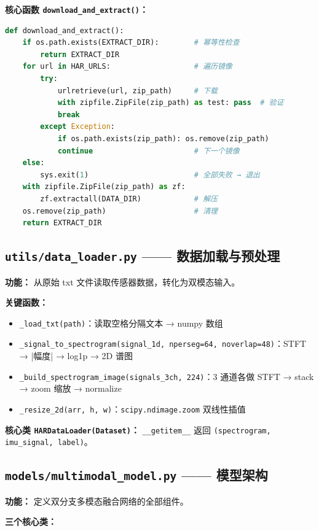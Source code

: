 \documentclass[12pt,a4paper]{ctexart}
\newcommand{\file}[1]{\texttt{#1}}
\newcommand{\code}[1]{\texttt{#1}}
\begin{document}
\textbf{核心函数 \code{download\_and\_extract()}：}

\begin{lstlisting}[language=Python]
def download_and_extract():
    if os.path.exists(EXTRACT_DIR):        # 幂等性检查
        return EXTRACT_DIR
    for url in HAR_URLS:                   # 遍历镜像
        try:
            urlretrieve(url, zip_path)     # 下载
            with zipfile.ZipFile(zip_path) as test: pass  # 验证
            break
        except Exception:
            if os.path.exists(zip_path): os.remove(zip_path)
            continue                       # 下一个镜像
    else:
        sys.exit(1)                        # 全部失败 → 退出
    with zipfile.ZipFile(zip_path) as zf:
        zf.extractall(DATA_DIR)            # 解压
    os.remove(zip_path)                    # 清理
    return EXTRACT_DIR
\end{lstlisting}

\subsection{\file{utils/data\_loader.py} —— 数据加载与预处理}

\textbf{功能：} 从原始 txt 文件读取传感器数据，转化为双模态输入。

\textbf{关键函数：}
\begin{itemize}
    \item \code{\_load\_txt(path)}：读取空格分隔文本 → numpy 数组
    \item \code{\_signal\_to\_spectrogram(signal\_1d, nperseg=64, noverlap=48)}：STFT → |幅度| → log1p → 2D 谱图
    \item \code{\_build\_spectrogram\_image(signals\_3ch, 224)}：3 通道各做 STFT → stack → zoom 缩放 → normalize
    \item \code{\_resize\_2d(arr, h, w)}：\code{scipy.ndimage.zoom} 双线性插值
\end{itemize}

\textbf{核心类 \code{HARDataLoader(Dataset)}：} \code{\_\_getitem\_\_} 返回 \code{(spectrogram, imu\_signal, label)}。

\subsection{\file{models/multimodal\_model.py} —— 模型架构}

\textbf{功能：} 定义双分支多模态融合网络的全部组件。

\textbf{三个核心类：}
\end{document}
